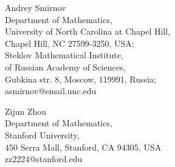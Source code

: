 \documentclass[10pt]{amsart}
\theoremstyle{definition}
\theoremstyle{definition}
\numberwithin{equation}{section}
\theoremstyle{Theorem}
\begin{document}






\vspace{12 mm}




\noindent
Andrey Smirnov\\
Department of Mathematics,\\
University of North Carolina at Chapel Hill,\\
Chapel Hill, NC 27599-3250, USA;\\
Steklov Mathematical Institute, \\
of Russian Academy of Sciences, \\
Gubkina str. 8, Moscow, 119991, Russia; \\
asmirnov@email.unc.edu


\vspace{3 mm}

\noindent
Zijun Zhou\\
Department of Mathematics,\\
Stanford University,\\
450 Serra Mall, Stanford, CA 94305, USA\\
zz2224@stanford.edu
\end{document}
